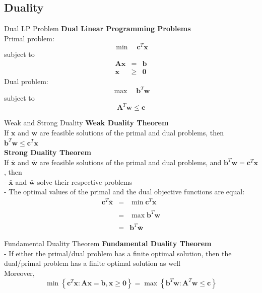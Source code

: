 \documentclass[aspectratio=169,hyperref,UTF8,CJK]{beamer}
\begin{document}
\subsection{Duality}
\begin{frame}{Dual LP Problem}
\textbf{Dual Linear Programming Problems} \\
Primal problem:
\[
\min \quad \mathbf{c}^T \mathbf{x}
\]
subject to
\[
\begin{array}{rcl} \mathbf{A}\mathbf{x} & = & \mathbf{b} \\ \mathbf{x} & \geq & \mathbf{0} \end{array}
\]
Dual problem:
\[
\max \quad \mathbf{b}^T \mathbf{w}
\]
subject to
\[
\mathbf{A}^T \mathbf{w} \leq \mathbf{c}
\]
\end{frame}

\begin{frame}{Weak and Strong Duality}
\textbf{Weak Duality Theorem} \\
If \(\mathbf{x}\) and \(\mathbf{w}\) are feasible solutions of the primal and dual problems, then \(\mathbf{b}^T\mathbf{w}\leq \mathbf{c}^T\mathbf{x}\) \\
\textbf{Strong Duality Theorem} \\
If \(\bar{\mathbf{x}}\) and \(\bar{\mathbf{w}}\) are feasible solutions of the primal and dual problems, and \(\mathbf{b}^T\mathbf{w} = \mathbf{c}^T\mathbf{x}\) , then \\
- \(\bar{\mathbf{x}}\) and \(\bar{\mathbf{w}}\) solve their respective problems \\
- The optimal values of the primal and the dual objective functions are equal:
\[
\begin{array}{rcl}{\mathbf{c}^T\mathbf{\bar{x}}}&{=}&{\min \mathbf{c}^T\mathbf{x}}\\{}&{}&{}\\{}&{=}&{\max \mathbf{b}^T\mathbf{w}}\\{}&{}&{}\\{}&{=}&{\mathbf{b}^T\mathbf{\bar{w}}}\end{array}
\]
\end{frame}

\begin{frame}{Fundamental Duality Theorem}
\textbf{Fundamental Duality Theorem} \\
- If either the primal/dual problem has a finite optimal solution, then the dual/primal problem has a finite optimal solution as well \\
Moreover,
\[
\min \left\{\mathbf{c}^T\mathbf{x}:\mathbf{A}\mathbf{x} = \mathbf{b},\mathbf{x}\geq \mathbf{0}\right\} = \max \left\{\mathbf{b}^T\mathbf{w}:\mathbf{A}^T\mathbf{w}\leq \mathbf{c}\right\}
\]
\end{frame}
\end{document}
